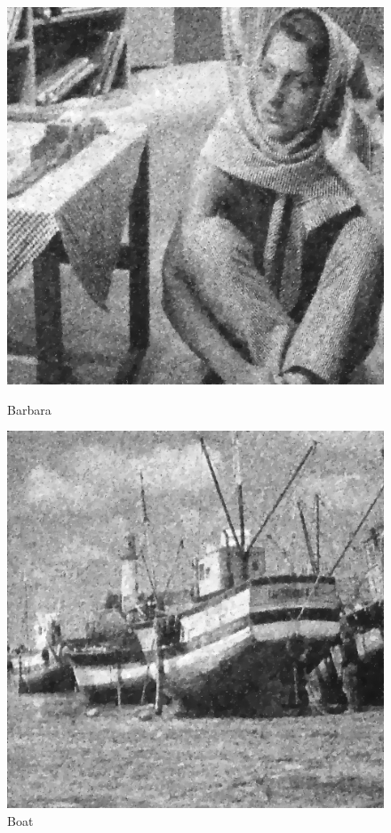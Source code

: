 \documentclass{article}
\begin{document}
    \begin{figure}[!htb]
      \includegraphics[scale=.45]{./edge_preserving_smoothing/barbara/gaussian.png}
      \caption{Barbara}
    \endminipage \hfill
      \includegraphics[scale=.45]{./edge_preserving_smoothing/boat/gaussian.png}
      \caption{Boat}
    \endminipage
    \end{figure}
    
\end{document}
